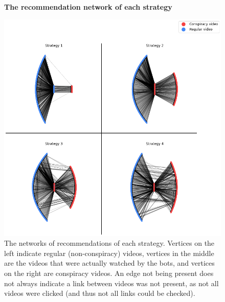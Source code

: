 \documentclass[../main.tex]{subfiles}
\begin{document}
\begin{figure}
  \textbf{The recommendation network of each strategy}\par\medskip
  \centering
  \includegraphics[keepaspectratio, width=\textwidth]{images/recommendation networks.png}
  \caption{The networks of recommendations of each strategy. Vertices on the left indicate regular (non-conspiracy) videos, vertices in the middle are the videos that were actually watched by the bots, and vertices on the right are conspiracy videos. An edge not being present does not always indicate a link between videos was not present, as not all videos were clicked (and thus not all links could be checked).}
  \label{fig:rec_net}
\end{figure}

\newpage
\end{document}
